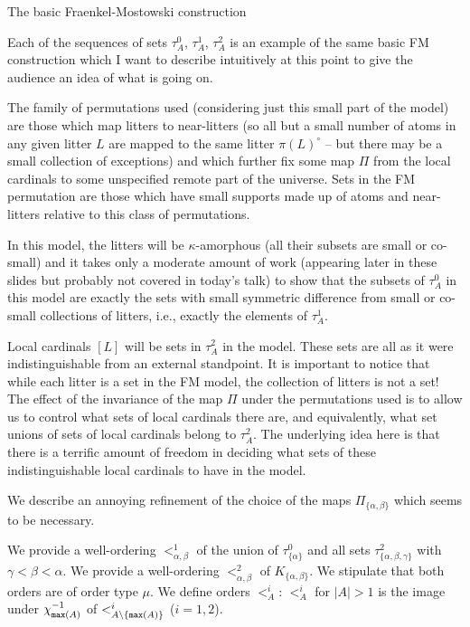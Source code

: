 \documentclass{slides}
\begin{document}
\begin{slide}

{\Large The basic Fraenkel-Mostowski construction}

Each of the sequences of sets $\tau^0_A$, $\tau^1_A$, $\tau^2_A$ is an example of the same basic FM construction which I want to describe intuitively at this point to give the audience an idea of what is going on.

The family of permutations used (considering just this small part of the model) are those which map litters to near-litters (so all but a small number of atoms in any given litter $L$ are mapped to the same litter $\pi(L)^{\circ}$ -- but there may be a small collection of exceptions) and which further fix some map $\Pi$ from the local cardinals to some unspecified remote part of the universe.  Sets in the FM permutation are those which have
small supports made up of atoms and near-litters relative to this class of permutations.

In this model, the litters will be $\kappa$-amorphous (all their subsets are small or co-small) and it takes only a moderate amount of work (appearing later in these slides but probably not covered in today's talk) to show that the subsets of $\tau^0_A$ in this model are exactly the sets with small symmetric difference from small or co-small collections of litters, i.e.,
exactly the elements of $\tau^1_A$.

Local cardinals $[L]$ will be sets in $\tau^2_A$ in the model.  These sets are all as it were indistinguishable from an external standpoint.  It is important to notice that while each litter is a set in the FM model, the collection of litters is not a set! The effect of the invariance of the map
$\Pi$ under the permutations used is to allow us to control what sets of local cardinals there are, and equivalently, what set unions of sets of local cardinals belong to $\tau^2_A$.  The underlying idea here is that there is a terrific amount of freedom in deciding what sets of these indistinguishable local cardinals to have in the model.

\end{slide}

\begin{slide}

We describe an annoying refinement of the choice of the maps $\Pi_{\{\alpha,\beta\}}$ which seems to be necessary.

We provide a well-ordering $<^1_{\alpha,\beta}$ of the union of $\tau^0_{\{\alpha\}}$ and all sets $\tau^2_{\{\alpha,\beta,\gamma\}}$ with $\gamma<\beta<\alpha$.  We provide a well-ordering $<^2_{\alpha,\beta}$ of $K_{\{\alpha,\beta\}}$.  We stipulate that both orders are of order type $\mu$.  We define orders $<^i_A$:  $<^i_A$ for $|A|>1$ is the image under $\chi_{{\tt max}(A)}^{-1}$ of $<^i_{A \setminus \{{\tt max}(A)\}}$ ($i=1,2$).

\end{slide}
\end{document}
